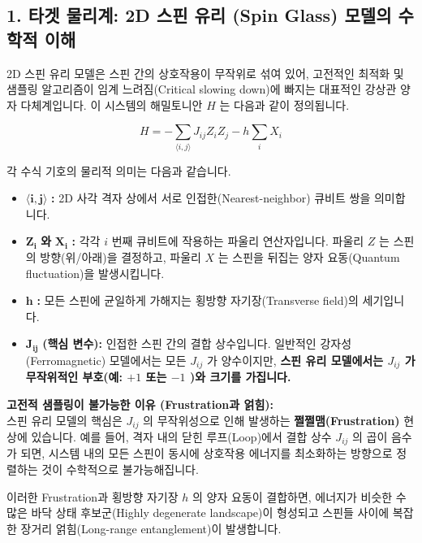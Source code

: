 \documentclass[11pt,a4paper]{article}
\begin{document}
\subsection*{1. 타겟 물리계: 2D 스핀 유리 (Spin Glass) 모델의 수학적 이해}

2D 스핀 유리 모델은 스핀 간의 상호작용이 무작위로 섞여 있어, 고전적인 최적화 및 샘플링 알고리즘이 임계 느려짐(Critical slowing down)에 빠지는 대표적인 강상관 양자 다체계입니다. 이 시스템의 해밀토니안 $H$ 는 다음과 같이 정의됩니다.

\begin{equation*}
H = -\sum_{\langle i,j \rangle} J_{ij} Z_i Z_j - h \sum_i X_i
\end{equation*}

각 수식 기호의 물리적 의미는 다음과 같습니다.

\begin{itemize}
    \item $\bm{\langle i,j \rangle}$ \textbf{:} 2D 사각 격자 상에서 서로 인접한(Nearest-neighbor) 큐비트 쌍을 의미합니다.
    \item $\bm{Z_i}$ \textbf{와} $\bm{X_i}$ \textbf{:} 각각 $i$ 번째 큐비트에 작용하는 파울리 연산자입니다. 파울리 $Z$ 는 스핀의 방향(위/아래)을 결정하고, 파울리 $X$ 는 스핀을 뒤집는 양자 요동(Quantum fluctuation)을 발생시킵니다.
    \item $\bm{h}$ \textbf{:} 모든 스핀에 균일하게 가해지는 횡방향 자기장(Transverse field)의 세기입니다.
    \item $\bm{J_{ij}}$ \textbf{(핵심 변수):} 인접한 스핀 간의 결합 상수입니다. 일반적인 강자성(Ferromagnetic) 모델에서는 모든 $J_{ij}$ 가 양수이지만, \textbf{스핀 유리 모델에서는 $J_{ij}$ 가 무작위적인 부호(예: $+1$ 또는 $-1$ )와 크기를 가집니다.}
\end{itemize}

\vspace{0.2em}
\textbf{고전적 샘플링이 불가능한 이유 (Frustration과 얽힘):} \\
스핀 유리 모델의 핵심은 $J_{ij}$ 의 무작위성으로 인해 발생하는 \textbf{쩔쩔맴(Frustration)} 현상에 있습니다. 예를 들어, 격자 내의 닫힌 루프(Loop)에서 결합 상수 $J_{ij}$ 의 곱이 음수가 되면, 시스템 내의 모든 스핀이 동시에 상호작용 에너지를 최소화하는 방향으로 정렬하는 것이 수학적으로 불가능해집니다.

이러한 Frustration과 횡방향 자기장 $h$ 의 양자 요동이 결합하면, 에너지가 비슷한 수많은 바닥 상태 후보군(Highly degenerate landscape)이 형성되고 스핀들 사이에 복잡한 장거리 얽힘(Long-range entanglement)이 발생합니다.
\end{document}
